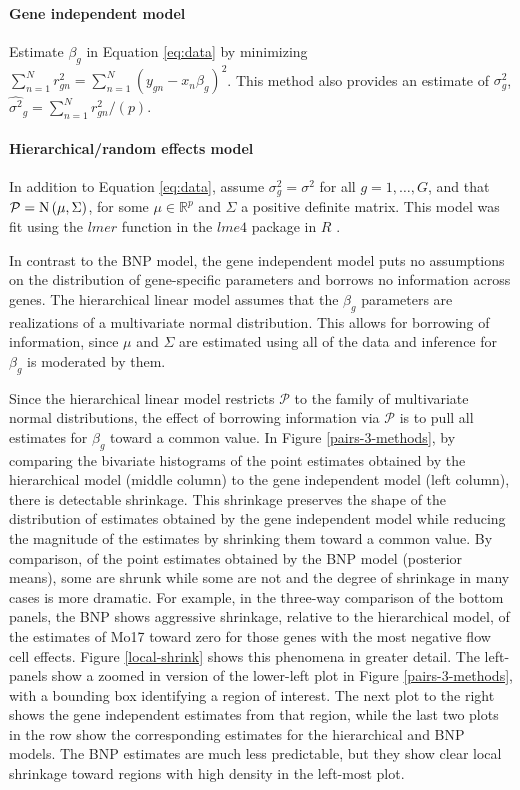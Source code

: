 {\paragraph{Gene independent model}
Estimate $\beta_g$ in Equation \ref{eq:data} by minimizing $\sum_{n=1}^N r_{gn}^2 = \sum_{n=1}^N\left(y_{gn}-x_n\beta_g\right)^2$. This method also provides an estimate of $\sigma_g^2$, $\hat{\sigma^2}_g = \sum_{n=1}^N r_{gn}^2/(p)$.

\paragraph{Hierarchical/random effects model}
In addition to Equation \ref{eq:data}, assume $\sigma^2_g = \sigma^2$ for all $g=1,\ldots,G$, and that $\mathcal{P} = \operatorname{N}\left(\mu, \Sigma \right)$, for some $\mu \in \mathbb{R}^p$ and $\Sigma$ a positive definite matrix. This model was fit using the $lmer$ function in the $lme4$ package in $R$ \citep{lme4,r}.

In contrast to the BNP model, the gene independent model puts no assumptions on the distribution of gene-specific parameters and borrows no information across genes. The hierarchical linear model assumes that the $\beta_g$ parameters are realizations of a multivariate normal distribution. This allows for borrowing of information, since $\mu$ and $\Sigma$ are estimated using all of the data and inference for $\beta_g$ is moderated by them.

Since the hierarchical linear model restricts $\mathcal{P}$ to the family of multivariate normal distributions, the effect of borrowing information via $\mathcal{P}$ is to pull all estimates for $\beta_g$ toward a common value. In Figure \ref{pairs-3-methods}, by comparing the bivariate histograms of the point estimates obtained by the hierarchical model (middle column) to the gene independent model (left column), there is detectable shrinkage. This shrinkage preserves the shape of the distribution of estimates obtained by the gene independent model while reducing the magnitude of the estimates by shrinking them toward a common value. By comparison, of the point estimates obtained by the BNP model (posterior means), some are shrunk while some are not and the degree of shrinkage in many cases is more dramatic. For example, in the three-way comparison of the bottom panels, the BNP shows aggressive shrinkage, relative to the hierarchical model, of the estimates of Mo17 toward zero for those genes with the most negative flow cell effects. Figure \ref{local-shrink} shows this phenomena in greater detail. The left-panels show a zoomed in version of the lower-left plot in Figure \ref{pairs-3-methods}, with a bounding box identifying a region of interest. The next plot to the right shows the gene independent estimates from that region, while the last two plots in the row show the corresponding estimates for the hierarchical and BNP models. The BNP estimates are much less predictable, but they show clear local shrinkage toward regions with high density in the left-most plot. %

}
